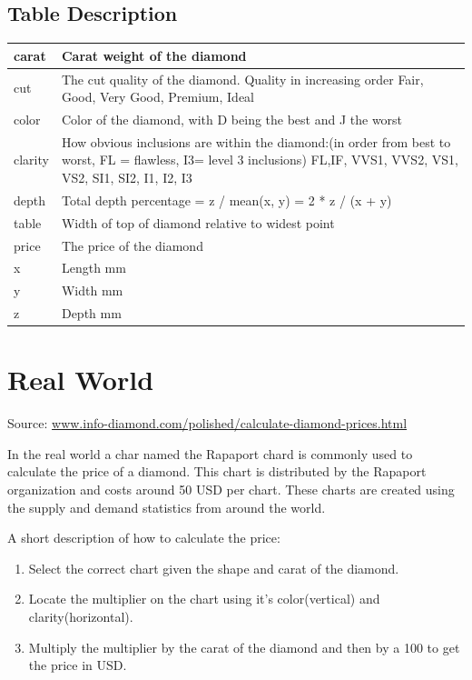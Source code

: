 \documentclass{scrreprt}
\begin{document}
		\section{Table Description}
		\begin{tabulary}{\linewidth}{lL}
			carat & Carat weight of the diamond \\\hline
			cut & The cut quality of the diamond. Quality in increasing order Fair, Good, Very Good, Premium, Ideal \\\hline
			color & Color of the diamond, with D being the best and J the worst \\\hline
			clarity & How obvious inclusions are within the diamond:(in order from best to worst, FL = flawless, I3= level 3 inclusions) FL,IF, VVS1, VVS2, VS1, VS2, SI1, SI2, I1, I2, I3 \\\hline
			depth & Total depth percentage = z / mean(x, y) = 2 * z / (x + y) \\\hline
			table & Width of top of diamond relative to widest point  \\\hline
			price & The price of the diamond \\\hline
			x & Length mm \\\hline
			y & Width mm \\\hline
			z & Depth mm \\\hline
		\end{tabulary}
	\chapter{Real World}
	Source: \url{www.info-diamond.com/polished/calculate-diamond-prices.html}\par
	\vspace{2em}
	In the real world a char named the Rapaport chard is commonly used to calculate the price of a diamond. This chart is distributed by the Rapaport organization and costs around 50 USD per chart. These charts are created using the supply and demand statistics from around the world.\par
	A short description of how to calculate the price:
	\begin{enumerate}
		\item Select the correct chart given the shape and carat of the diamond.
		\item Locate the multiplier on the chart using it's color(vertical) and clarity(horizontal).
		\item Multiply the multiplier by the carat of the diamond and then by a 100 to get the price in USD.
	\end{enumerate}
\end{document}
